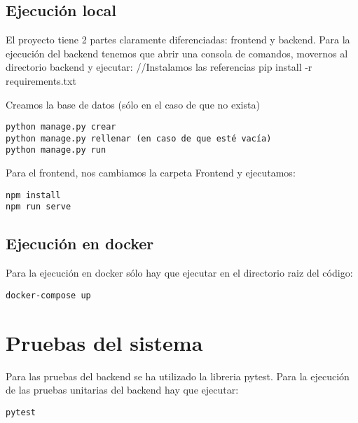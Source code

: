 \subsection {Ejecución local}
El proyecto tiene 2 partes claramente diferenciadas: frontend y backend.
Para la ejecución del backend tenemos que abrir una consola de comandos, movernos al directorio backend 
y ejecutar:
//Instalamos las referencias
pip install -r requirements.txt

Creamos la base de datos (sólo en el caso de que no exista)
\begin{verbatim}
python manage.py crear
python manage.py rellenar (en caso de que esté vacía)
python manage.py run
\end{verbatim}

Para el frontend, nos cambiamos la carpeta Frontend y ejecutamos:
\begin{verbatim}
npm install
npm run serve
\end{verbatim}

\subsection {Ejecución en docker}
Para la ejecución en docker sólo hay que ejecutar en el directorio raiz del código:
\begin{verbatim}
docker-compose up
\end{verbatim}

\section{Pruebas del sistema}
Para las pruebas del backend se ha utilizado la libreria pytest. 
Para la ejecución de las pruebas unitarias del backend hay que ejecutar:
\begin{verbatim}
pytest
\end{verbatim}

